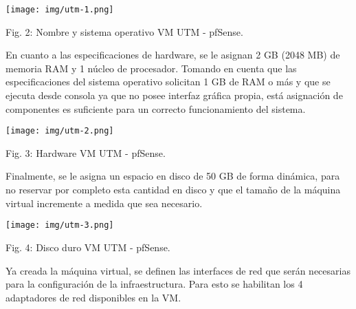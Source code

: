 \documentclass[12pt,oneside,a4paper]{book}
\begin{document}
\vspace{2em}

\begin{center}
    \texttt{[image: img/utm-1.png]}
    
\vspace{0.1em}
    
    Fig. 2: Nombre y sistema operativo VM UTM - pfSense.
\end{center}

\vspace{2em}

\hspace{20pt}
En cuanto a las especificaciones de hardware, se le asignan 2 GB (2048 MB) de memoria RAM y 1 núcleo de procesador. Tomando en cuenta que las especificaciones del sistema operativo solicitan 1 GB de RAM o más y que se ejecuta desde consola ya que no posee interfaz gráfica propia, está asignación de componentes es suficiente para un correcto funcionamiento del sistema.

\vspace{2em}

\begin{center}
    \texttt{[image: img/utm-2.png]}
    
\vspace{0.1em}
    
    Fig. 3: Hardware VM UTM - pfSense.
\end{center}

\vspace{2em}

\hspace{20pt}
Finalmente, se le asigna un espacio en disco de 50 GB de forma dinámica, para no reservar por completo esta cantidad en disco y que el tamaño de la máquina virtual incremente a medida que sea necesario.

\vspace{2em}

\begin{center}
    \texttt{[image: img/utm-3.png]}
    
\vspace{0.1em}
    
    Fig. 4: Disco duro VM UTM - pfSense.
\end{center}

\vspace{2em}

\hspace{20pt}
Ya creada la máquina virtual, se definen las interfaces de red que serán necesarias para la configuración de la infraestructura. Para esto se habilitan los 4 adaptadores de red disponibles en la VM.
\end{document}
